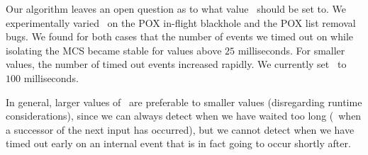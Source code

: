  Our algorithm leaves an open question as to what value
\textepsilon~should be set to. We experimentally varied \textepsilon~on the
POX in-flight blackhole and the POX list removal bugs.
We found for both cases that the number of events we timed out on while isolating the MCS became stable for values above $25$ milliseconds.
For smaller values, the number of timed out events increased rapidly. We
currently set \textepsilon~to $100$ milliseconds.


In general, larger values of \textepsilon~are preferable to
smaller values (disregarding runtime considerations), since we can always
detect when we have waited too long (\viz~when a successor of the next input
has occurred), but we cannot detect when we have timed out
early on an internal event that is in fact going to occur shortly after.

